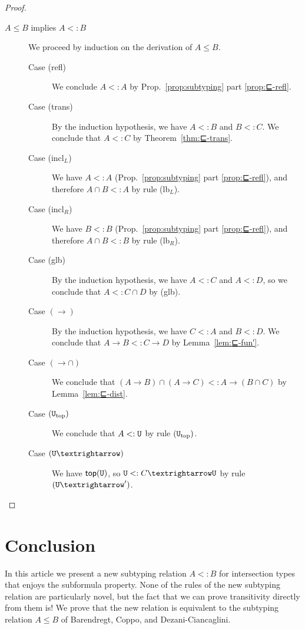 \documentclass{article}
\begin{document}
\begin{proof}
\begin{description}
  \item[$A ≤ B$ implies $A <: B$]
    We proceed by induction on the derivation of $A ≤ B$.
    \begin{description}
    \item[Case (refl)] We conclude $A <: A$ by Prop.~\ref{prop:subtyping}
      part \ref{prop:⊑-refl}.
    \item[Case (trans)]
      By the induction hypothesis, we have $A <: B$ and $B <: C$.
      We conclude that $A <: C$ by Theorem~\ref{thm:⊑-trans}.
    \item[Case (incl$_L$)] We have $A <: A$
      (Prop.~\ref{prop:subtyping} part \ref{prop:⊑-refl}),
      and therefore $A ∩ B <: A$ by rule (lb$_L$).
    \item[Case (incl$_R$)] We have $B <: B$
      (Prop.~\ref{prop:subtyping} part \ref{prop:⊑-refl}),
      and therefore $A ∩ B <: B$ by rule (lb$_R$).
    \item[Case (glb)] By the induction hypothesis, we have
      $A <: C$ and $A <: D$, so we conclude that $A <: C ∩ D$ by (glb).
    \item[Case $(→)$] By the induction hypothesis, we have $C <: A$
      and $B <: D$. We conclude that $A → B <: C → D$
      by Lemma~\ref{lem:⊑-fun′}.
    \item[Case $({→}{∩})$] We conclude that
      $(A → B) ∩ (A → C) <: A → (B ∩ C)$
      by Lemma~\ref{lem:⊑-dist}.
    \item[Case $(\mathtt{U}_{\mathrm{top}})$]
      We conclude that $A <: \mathtt{U}$ by rule $(\mathtt{U}_{\mathrm{top}})$.
    \item[Case $(\TOP{→})$]
      We have $\mathsf{top}(\mathtt{U})$, so $\TOP <: C → \TOP$ by rule $(\TOP{→}')$.
    \end{description}
    
  \end{description}
\end{proof}

\section{Conclusion}
\label{sec:conclude}

In this article we present a new subtyping relation $A <: B$ for
intersection types that enjoys the subformula property.  None of the
rules of the new subtyping relation are particularly novel, but the
fact that we can prove transitivity directly from them is!  We prove
that the new relation is equivalent to the subtyping relation $A ≤ B$
of Barendregt, Coppo, and Dezani-Ciancaglini.

\pagebreak



\end{document}
